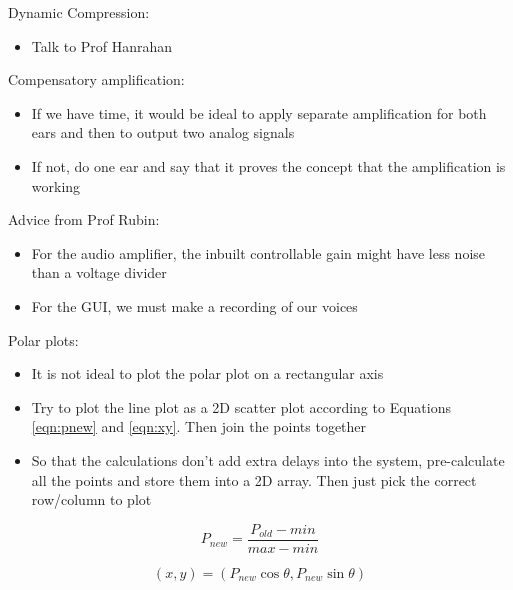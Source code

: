 \documentclass[10pt,onecolumn]{witseiepaper}
\begin{document}
Dynamic Compression:
\begin{itemize}
	\item Talk to Prof Hanrahan
\end{itemize}

Compensatory amplification:
\begin{itemize}
	\item If we have time, it would be ideal to apply separate amplification for both ears and then to output two analog signals
	\item If not, do one ear and say that it proves the concept that the amplification is working 
\end{itemize}

Advice from Prof Rubin:
\begin{itemize}
	\item For the audio amplifier, the inbuilt controllable gain might have less noise than a voltage divider
	\item For the GUI, we must make a recording of our voices
\end{itemize}

Polar plots:
\begin{itemize}
	\item It is not ideal to plot the polar plot on a rectangular axis
	\item Try to plot the line plot as a 2D scatter plot according to Equations \ref{eqn:pnew} and \ref{eqn:xy}. Then join the points together
	\item So that the calculations don't add extra delays into the system, pre-calculate all the points and store them into a 2D array. Then just pick the correct row/column to plot
\end{itemize}

\begin{equation}
P_{new}= \frac{P_{old} - min}{max - min} 
\label{eqn:pnew}
\end{equation}

\begin{equation}
(x,y)= (P_{new}\cos \theta, P_{new}\sin \theta)
\label{eqn:xy}
\end{equation}
\end{document}
